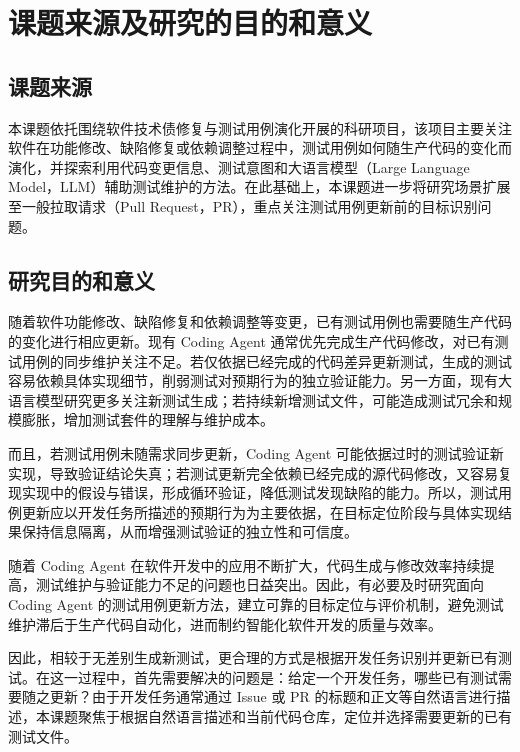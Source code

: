 
\section{课题来源及研究的目的和意义}

\subsection{课题来源}

本课题依托围绕软件技术债修复与测试用例演化开展的科研项目，该项目主要关注软件在功能修改、缺陷修复或依赖调整过程中，测试用例如何随生产代码的变化而演化，并探索利用代码变更信息、测试意图和大语言模型（Large Language Model，LLM）辅助测试维护的方法。在此基础上，本课题进一步将研究场景扩展至一般拉取请求（Pull Request，PR），重点关注测试用例更新前的目标识别问题。


\subsection{研究目的和意义}

随着软件功能修改、缺陷修复和依赖调整等变更，已有测试用例也需要随生产代码的变化进行相应更新。现有 Coding Agent 通常优先完成生产代码修改，对已有测试用例的同步维护关注不足。若仅依据已经完成的代码差异更新测试，生成的测试容易依赖具体实现细节，削弱测试对预期行为的独立验证能力。另一方面，现有大语言模型研究更多关注新测试生成；若持续新增测试文件，可能造成测试冗余和规模膨胀，增加测试套件的理解与维护成本。

而且，若测试用例未随需求同步更新，Coding Agent 可能依据过时的测试验证新实现，导致验证结论失真；若测试更新完全依赖已经完成的源代码修改，又容易复现实现中的假设与错误，形成循环验证，降低测试发现缺陷的能力。所以，测试用例更新应以开发任务所描述的预期行为为主要依据，在目标定位阶段与具体实现结果保持信息隔离，从而增强测试验证的独立性和可信度。

随着 Coding Agent 在软件开发中的应用不断扩大，代码生成与修改效率持续提高，测试维护与验证能力不足的问题也日益突出。因此，有必要及时研究面向 Coding Agent 的测试用例更新方法，建立可靠的目标定位与评价机制，避免测试维护滞后于生产代码自动化，进而制约智能化软件开发的质量与效率。

因此，相较于无差别生成新测试，更合理的方式是根据开发任务识别并更新已有测试。在这一过程中，首先需要解决的问题是：给定一个开发任务，哪些已有测试需要随之更新？由于开发任务通常通过 Issue 或 PR 的标题和正文等自然语言进行描述，本课题聚焦于根据自然语言描述和当前代码仓库，定位并选择需要更新的已有测试文件。

